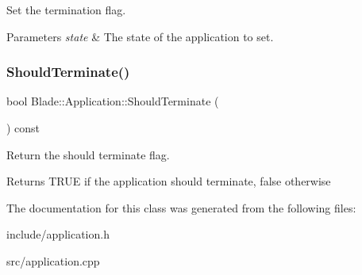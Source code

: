Set the termination flag. 


\begin{DoxyParams}{Parameters}
{\em state} & The state of the application to set. \\
\hline
\end{DoxyParams}
\mbox{\label{class_blade_1_1_application_a68aba5838320ebb7b2683954ffee050b}} 
\subsubsection{\texorpdfstring{Should\+Terminate()}{ShouldTerminate()}}
{\footnotesize\ttfamily bool Blade\+::\+Application\+::\+Should\+Terminate (\begin{DoxyParamCaption}{ }\end{DoxyParamCaption}) const\hspace{0.3cm}{\ttfamily [noexcept]}}



Return the should terminate flag. 

\begin{DoxyReturn}{Returns}
T\+R\+UE if the application should terminate, false otherwise 
\end{DoxyReturn}


The documentation for this class was generated from the following files\+:\begin{DoxyCompactItemize}
\item 
include/application.\+h\item 
src/application.\+cpp\end{DoxyCompactItemize}
